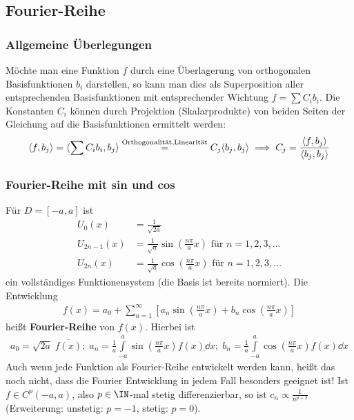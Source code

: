   \subsection{Fourier-Reihe}\label{FourReihe}
  \subsubsection{Allgemeine Überlegungen}
  Möchte man eine Funktion $f$ durch eine Überlagerung von orthogonalen Basisfunktionen $b_i$ darstellen, so kann man dies als Superposition aller entsprechenden Basisfunktionen mit entsprechender Wichtung $f=\sum C_i b_i$. Die Konstanten $C_i$ können durch Projektion (Skalarprodukte) von beiden Seiten der Gleichung auf die Basisfunktionen ermittelt werden: 
  \begin{equation}\label{FourKAllg}
  	\langle f,b_j\rangle = \langle\sum C_i b_i, b_j\rangle \stackrel{\text{Orthogonalität,\\Linearität}}{=}C_j \langle b_j,b_j\rangle \implies C_j=\frac{\langle f,b_j\rangle}{\langle b_j,b_j\rangle}
  \end{equation}
  \subsubsection{Fourier-Reihe mit sin und cos}
		   Für $D = [-a, a]$ ist
		        \begin{equation}\begin{split}
				        U_0(x) & = \frac{1}{\sqrt{2a}} \\
				        U_{2n-1}(x) & =  \frac{1}{\sqrt{a}}\sin\left(\frac{n\pi}{a}x\right) \text{ für } n=1,2,3,\dots\\
				        U_{2n}(x) &=  \frac{1}{\sqrt{a}}\cos\left(\frac{n\pi}{a}x\right) \text{ für } n=1,2,3,\dots
			        \end{split}\end{equation}
		        ein vollständiges Funktionensystem (die Basis ist bereits normiert). Die Entwicklung
		        \begin{equation}\begin{split}
				        f(x) = a_0 + \sum_{n=1}^\infty \left[  a_n \sin\left(\frac{n\pi}{a}x\right) + b_n \cos\left(\frac{n\pi}{a}x\right)\right]
			        \end{split}\end{equation} heißt \textbf{Fourier-Reihe} von $f(x)$.
		   Hierbei ist
		        \begin{equation}\begin{split}
				        a_0 = \sqrt{2a}\; \overline{f(x)};\; a_n = \frac{1}{a} \int\limits_{-a}^a \sin\left(\frac{n\pi}{a}x\right) f(x) \dd x ;\; b_n = \frac{1}{a} \int\limits_{-a}^a \cos\left(\frac{n\pi}{a}x\right) f(x) \dd x
			        \end{split}\end{equation}
	  Auch wenn jede Funktion als Fourier-Reihe entwickelt werden kann, heißt das noch nicht, dass die Fourier Entwicklung in jedem Fall besonders geeignet ist! Ist $f\in C^p(-a,a)$, also $p\in\IN$-mal stetig differenzierbar, so ist $c_n\propto\frac{1}{n^{p+2}}$ (Erweiterung: unstetig: $p=-1$, stetig: $p=0$). 
